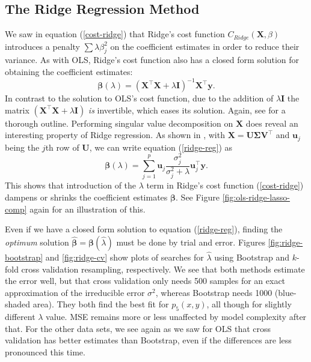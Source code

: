 \documentclass[]{article}
\begin{document}
\subsection{The Ridge Regression Method}
We saw in equation (\ref{cost-ridge}) that Ridge's cost function $C_{Ridge}(\mathbf{X},\mathbb{\beta})$ introduces a penalty $\sum \lambda \beta_j^2$ on the coefficient estimates in order to reduce their variance. As with OLS, Ridge's cost function also has a closed form solution for obtaining the coefficient estimates:
\begin{equation}
\label{ridge-reg}
	\mathbf{\beta}(\lambda) = (\mathbf{X}^\intercal \mathbf{X} + \lambda \mathbf{I})^{-1} \mathbf{X}^\intercal \mathbf{y}.
\end{equation}
In contrast to the solution to OLS's cost function, due to the addition of $\lambda \mathbf{I}$ the matrix $(\mathbf{X}^\intercal \mathbf{X} + \lambda \mathbf{I})$ \textit{is} invertible, which eases its solution. Again, see \cite{van2015lecture} for a thorough outline. Performing singular value decomposition on $\mathbf{X}$ does reveal an interesting property of Ridge regression. As shown in \cite{murphy2012machine}, with $\mathbf{X} = \mathbf{U \Sigma V}^\intercal$ and $\mathbf{u}_j$ being the $j$th row of $\mathbf{U}$, we can write equation (\ref{ridge-reg}) as
\begin{equation}
	\mathbf{\beta}(\lambda) = \sum_{j=1}^{p} \mathbf{u}_j \frac{\sigma_j^2}{\sigma_j^2 + \lambda} \mathbf{u}_j ^\intercal \mathbf{y}.
\end{equation}
This shows that introduction of the $\lambda$ term in Ridge's cost function (\ref{cost-ridge}) dampens or shrinks the coefficient estimates $\mathbf{\beta}$. See Figure \ref{fig:ols-ridge-lasso-comp} again for an illustration of this.

Even if we have a closed form solution to equation (\ref{ridge-reg}), finding the \textit{optimum} solution $\mathbf{\hat{\beta}} = \mathbf{\beta}(\hat{\lambda})$ must be done by trial and error. Figures \ref{fig:ridge-bootstrap} and \ref{fig:ridge-cv} show plots of searches for $\hat{\lambda}$ using Bootstrap and $k$-fold cross validation resampling, respectively. We see that both methods estimate the error well, but that cross validation only needs 500 samples for an exact approximation of the irreducible error $\sigma^2$, whereas Bootstrap needs 1000 (blue-shaded area). They both find the best fit for $p_5(x,y)$, all though for slightly different $\lambda$ value. MSE remains more or less unaffected by model complexity after that. For the other data sets, we see again as we saw for OLS that cross validation has better estimates than Bootstrap, even if the differences are less pronounced this time.
\end{document}
